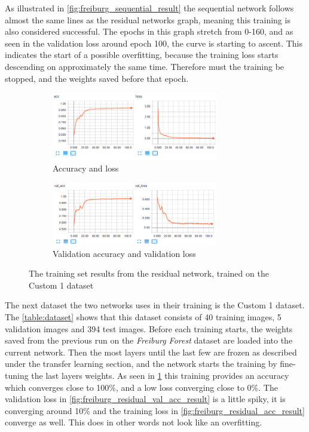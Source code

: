 \documentclass[USenglish]{ifimaster}  %
\begin{document}
As illustrated in \cref{fig:freiburg_sequential_result} the sequential network follows almost the same lines as the residual networks graph, meaning this training is also considered successful. The epochs in this graph stretch from 0-160, and as seen in the validation loss around epoch 100, the curve is starting to ascent. This indicates the start of a possible overfitting, because the training loss starts descending on approximately the same time. Therefore must the training be stopped, and the weights saved before that epoch. 

\begin{figure}[ht]
\centering
\begin{subfigure}[b]{\textwidth}
\centering
\includegraphics[width=0.8\textwidth]{bilder/custom_1_training/Custom_1_residual_training_acc_results.png}
\caption{Accuracy and loss}
\label{fig:custom_1_residual_acc_result}
\end{subfigure}
\hfill
\begin{subfigure}[b]{\textwidth}
\centering
\includegraphics[width=0.8\textwidth]{bilder/custom_1_training/Custom_1_residual_training_val_acc_results.png}
\caption{Validation accuracy and validation loss}
\label{fig:custom_1_residual_val_acc_result}
\end{subfigure}
\caption{The training set results from the residual network, trained on the Custom 1 dataset}
\label{fig:custom_1_residual_result}
\end{figure}

The next dataset the two networks uses in their training is the Custom 1 dataset. The \cref{table:dataset} shows that this dataset consists of 40 training images, 5 validation images and 394 test images. Before each training starts, the weights saved from the previous run on the \textit{Freiburg Forest} dataset are loaded into the current network. Then the most layers until the last few are frozen as described under the transfer learning section, and the network starts the training by fine-tuning the last layers weights. As seen in \cref{fig:custom_1_residual_acc_result} this training provides an accuracy which converges close to 100\%, and a low loss converging close to 0\%. The validation loss in \cref{fig:freiburg_residual_val_acc_result} is a little spiky, it is converging around 10\% and the training loss in \cref{fig:freiburg_residual_acc_result} converge as well. This does in other words not look like an overfitting. 
\end{document}
